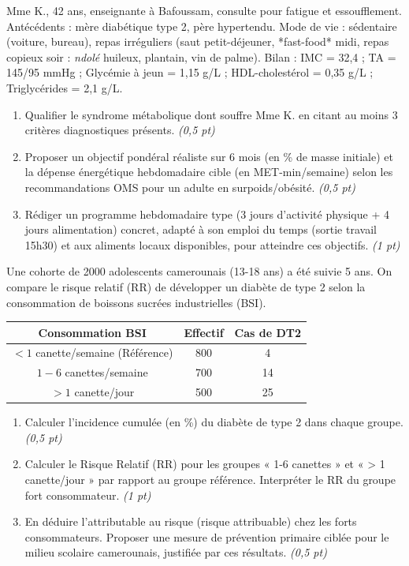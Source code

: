 \documentclass[11pt]{article}
\begin{document}
\begin{exercice}
Mme K., 42 ans, enseignante à Bafoussam, consulte pour fatigue et essoufflement. Antécédents : mère diabétique type 2, père hypertendu. Mode de vie : sédentaire (voiture, bureau), repas irréguliers (saut petit-déjeuner, *fast-food* midi, repas copieux soir : \textit{ndolé} huileux, plantain, vin de palme). Bilan : IMC = 32,4 ; TA = 145/95 mmHg ; Glycémie à jeun = 1,15 g/L ; HDL-cholestérol = 0,35 g/L ; Triglycérides = 2,1 g/L.
\begin{enumerate}
    \item Qualifier le syndrome métabolique dont souffre Mme K. en citant au moins 3 critères diagnostiques présents. \textit{(0,5 pt)}
    \item Proposer un objectif pondéral réaliste sur 6 mois (en \% de masse initiale) et la dépense énergétique hebdomadaire cible (en MET-min/semaine) selon les recommandations OMS pour un adulte en surpoids/obésité. \textit{(0,5 pt)}
    \item Rédiger un programme hebdomadaire type (3 jours d'activité physique + 4 jours alimentation) concret, adapté à son emploi du temps (sortie travail 15h30) et aux aliments locaux disponibles, pour atteindre ces objectifs. \textit{(1 pt)}
\end{enumerate}
\end{exercice}

\begin{exercice}
Une cohorte de 2000 adolescents camerounais (13-18 ans) a été suivie 5 ans. On compare le risque relatif (RR) de développer un diabète de type 2 selon la consommation de boissons sucrées industrielles (BSI).
\begin{center}
\begin{tabular}{c c c}
\hline
\textbf{Consommation BSI} & \textbf{Effectif} & \textbf{Cas de DT2} \\
\hline
$< 1$ canette/semaine (Référence) & 800 & 4 \\
$1-6$ canettes/semaine & 700 & 14 \\
$> 1$ canette/jour & 500 & 25 \\
\hline
\end{tabular}
\end{center}
\begin{enumerate}
    \item Calculer l'incidence cumulée (en \%) du diabète de type 2 dans chaque groupe. \textit{(0,5 pt)}
    \item Calculer le Risque Relatif (RR) pour les groupes « 1-6 canettes » et « > 1 canette/jour » par rapport au groupe référence. Interpréter le RR du groupe fort consommateur. \textit{(1 pt)}
    \item En déduire l'attributable au risque (risque attribuable) chez les forts consommateurs. Proposer une mesure de prévention primaire ciblée pour le milieu scolaire camerounais, justifiée par ces résultats. \textit{(0,5 pt)}
\end{enumerate}
\end{exercice}
\end{document}
